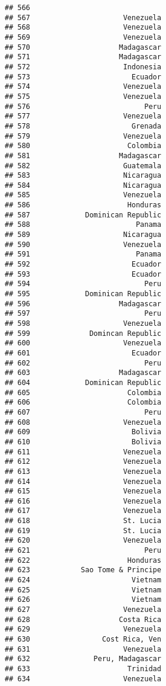 \documentclass[
]{article}
\begin{document}
\begin{verbatim}
## 566                               
## 567                      Venezuela
## 568                      Venezuela
## 569                      Venezuela
## 570                     Madagascar
## 571                     Madagascar
## 572                      Indonesia
## 573                        Ecuador
## 574                      Venezuela
## 575                      Venezuela
## 576                           Peru
## 577                      Venezuela
## 578                        Grenada
## 579                      Venezuela
## 580                       Colombia
## 581                     Madagascar
## 582                      Guatemala
## 583                      Nicaragua
## 584                      Nicaragua
## 585                      Venezuela
## 586                       Honduras
## 587             Dominican Republic
## 588                         Panama
## 589                      Nicaragua
## 590                      Venezuela
## 591                         Panama
## 592                        Ecuador
## 593                        Ecuador
## 594                           Peru
## 595             Dominican Republic
## 596                     Madagascar
## 597                           Peru
## 598                      Venezuela
## 599              Domincan Republic
## 600                      Venezuela
## 601                        Ecuador
## 602                           Peru
## 603                     Madagascar
## 604             Dominican Republic
## 605                       Colombia
## 606                       Colombia
## 607                           Peru
## 608                      Venezuela
## 609                        Bolivia
## 610                        Bolivia
## 611                      Venezuela
## 612                      Venezuela
## 613                      Venezuela
## 614                      Venezuela
## 615                      Venezuela
## 616                      Venezuela
## 617                      Venezuela
## 618                      St. Lucia
## 619                      St. Lucia
## 620                      Venezuela
## 621                           Peru
## 622                       Honduras
## 623            Sao Tome & Principe
## 624                        Vietnam
## 625                        Vietnam
## 626                        Vietnam
## 627                      Venezuela
## 628                     Costa Rica
## 629                      Venezuela
## 630                 Cost Rica, Ven
## 631                      Venezuela
## 632               Peru, Madagascar
## 633                       Trinidad
## 634                      Venezuela

\end{verbatim}
\end{document}

